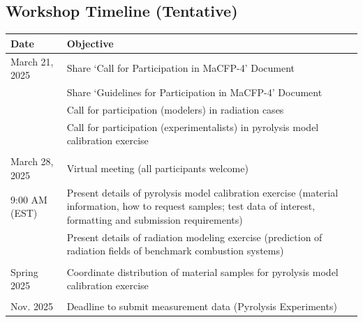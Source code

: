 \documentclass[12pt]{article}
\begin{document}
\subsection*{Workshop Timeline (Tentative)} 
\label{Timeline}
\small
\begin{table} [h!]
\begin{tabular}{p{0.16\linewidth} | p{0.84\linewidth}}
\hline
\textbf{Date}          & \textbf{Objective} \\
\hline
March 21, 2025  	& Share `Call for Participation in MaCFP-4' Document\\
    & Share `Guidelines for Participation in MaCFP-4' Document \\
    & Call for participation (modelers) in radiation cases\\
    & Call for participation (experimentalists) in pyrolysis model calibration exercise\\
\\
March 28, 2025         & Virtual meeting (all participants welcome)\\
9:00 AM (EST)   	& Present details of pyrolysis model calibration exercise (material information, how to request samples; test data of interest, formatting and submission requirements)\\
& Present details of radiation modeling exercise (prediction of radiation fields of benchmark combustion systems)\\
\\
Spring 2025  	& Coordinate distribution of material samples for pyrolysis model calibration exercise\\
\\
Nov. 2025        	& Deadline to submit measurement data (Pyrolysis Experiments)\\

\end{tabular}
\end{table}
\end{document}
